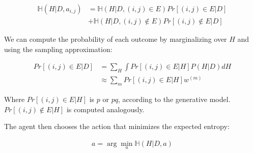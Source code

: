 \documentclass[11pt]{article}
\begin{document}
\begin{align}
    \mathbb{H}(H|D,a_{i,j}) &= \mathbb{H}(H|D, (i,j) \in E) Pr[(i,j) \in E | D]  \\
                            &+ \mathbb{H}(H|D, (i,j) \notin E) Pr[(i,j) \notin E | D]
\end{align}

We can compute the probability of each outcome by marginalizing over $H$ and using the sampling approximation:

\begin{align}
    Pr[(i,j) \in E | D] &=  \sum_H \int Pr[(i,j) \in E | H] P(H|D)  dH \\
                       &\approx \sum_m  Pr[(i,j) \in E | H] w^{(m)} 
\end{align}

Where $Pr[(i,j) \in E | H]$ is $p$ or $pq$, according to the generative model. $Pr[(i,j) \notin E | H]$ is computed analogously.

The agent then chooses the action that minimizes the expected entropy:

\begin{align}
    a = \arg \min_a \mathbb{H}(H|D,a)
\end{align}
\end{document}
